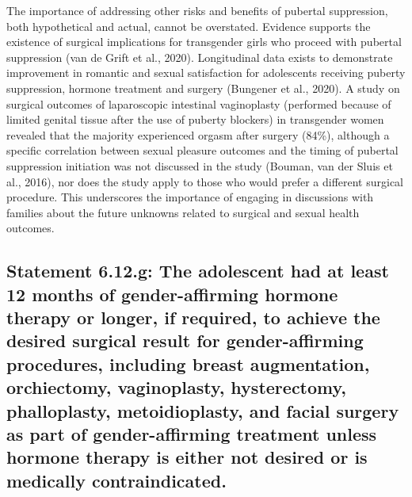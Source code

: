 \documentclass[
]{book}
\begin{document}
The importance of addressing other risks and
benefits of pubertal suppression, both hypothetical and actual, cannot be overstated. Evidence
supports the existence of surgical implications for
transgender girls who proceed with pubertal suppression (van de Grift et al., 2020). Longitudinal
data exists to demonstrate improvement in
romantic and sexual satisfaction for adolescents
receiving puberty suppression, hormone treatment
and surgery (Bungener et al., 2020). A study on
surgical outcomes of laparoscopic intestinal vaginoplasty (performed because of limited genital
tissue after the use of puberty blockers) in transgender women revealed that the majority experienced orgasm after surgery (84\%), although a
specific correlation between sexual pleasure outcomes and the timing of pubertal suppression
initiation was not discussed in the study (Bouman,
van der Sluis et al., 2016), nor does the study
apply to those who would prefer a different surgical procedure. This underscores the importance
of engaging in discussions with families about
the future unknowns related to surgical and sexual health outcomes.

\hypertarget{statement-6.12.g-the-adolescent-had-at-least-12-months-of-gender-affirming-hormone-therapy-or-longer-if-required-to-achieve-the-desired-surgical-result-for-gender-affirming-procedures-including-breast-augmentation-orchiectomy-vaginoplasty-hysterectomy-phalloplasty-metoidioplasty-and-facial-surgery-as-part-of-gender-affirming-treatment-unless-hormone-therapy-is-either-not-desired-or-is-medically-contraindicated.}{%
\subsection*{Statement 6.12.g: The adolescent had at least 12 months of gender-affirming hormone therapy or longer, if required, to achieve the desired surgical result for gender-affirming procedures, including breast augmentation, orchiectomy, vaginoplasty, hysterectomy, phalloplasty, metoidioplasty, and facial surgery as part of gender-affirming treatment unless hormone therapy is either not desired or is medically contraindicated.}\label{statement-6.12.g-the-adolescent-had-at-least-12-months-of-gender-affirming-hormone-therapy-or-longer-if-required-to-achieve-the-desired-surgical-result-for-gender-affirming-procedures-including-breast-augmentation-orchiectomy-vaginoplasty-hysterectomy-phalloplasty-metoidioplasty-and-facial-surgery-as-part-of-gender-affirming-treatment-unless-hormone-therapy-is-either-not-desired-or-is-medically-contraindicated.}}
\end{document}
